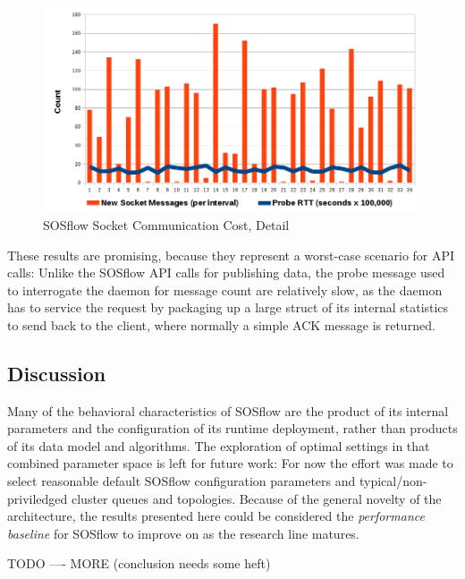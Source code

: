 \begin{figure}[h]
\centering
\includegraphics[width=\columnwidth]{images/icebox_api_cost_zoom.png}
\caption{SOSflow Socket Communication Cost, Detail}
\label{sock_cost_detail}
\end{figure}
%
\par
%
These results are promising, because they represent a worst-case
scenario for API calls: Unlike the SOSflow API calls for publishing
data, the probe message used to interrogate the daemon for message
count are relatively slow, as the daemon has to service the request by
packaging up a large struct of its internal statistics to send back to
the client, where normally a simple ACK message is returned.
%
%


\subsection{Discussion} %
%
Many of the behavioral characteristics of SOSflow are the product of
its internal parameters and the configuration of its runtime
deployment, rather than products of its data model and algorithms.
%
The exploration of optimal settings in that combined parameter space
is left for future work: For now the effort was made to select
reasonable default SOSflow configuration parameters and
typical/non-priviledged cluster queues and topologies.
%
Because of the general novelty of the architecture, the results
presented here could be considered the \textit{performance baseline}
for SOSflow to improve on as the research line matures.
%
\par
%
TODO ---- MORE (conclusion needs some heft)



